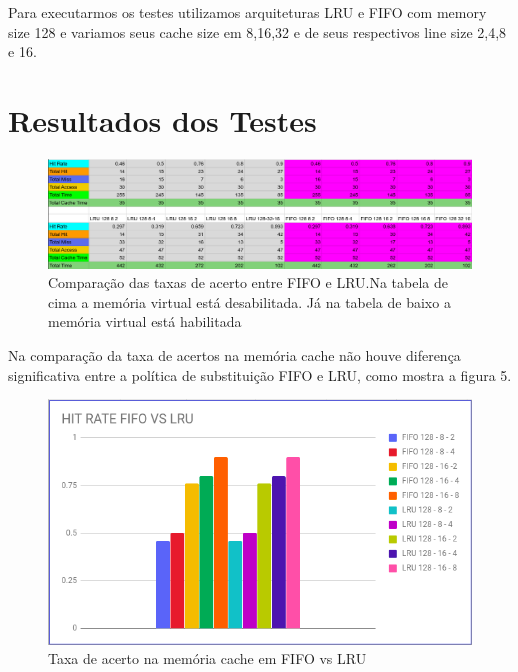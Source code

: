 \documentclass[conference]{IEEEtran}
\begin{document}
Para executarmos os testes utilizamos arquiteturas LRU e FIFO com memory size 128 e variamos seus cache size em 8,16,32 e de seus respectivos line size 2,4,8 e 16. 

\section{Resultados dos Testes}

\begin{figure}[H]
    \includegraphics[width=\linewidth]{Imagens/Tabela.png}
    \caption{Comparação das taxas de acerto entre FIFO e LRU.\break Na tabela de cima a memória virtual está desabilitada. Já na tabela de baixo a memória virtual está habilitada}
    \label{fig:Comparação das taxas de acerto entre FIFO e LRU. Na tabela de cima a memória virtual está desabilitada. Já na tabela de baixo a memória virtual está habilitada}
\end{figure}

Na comparação da taxa de acertos na memória cache não houve diferença significativa entre a política de substituição FIFO e LRU, como mostra a figura 5.

\begin{figure}[H]
    \includegraphics[width=\linewidth]{Imagens/Hit_RATE_FIFO_VS_LRU.png}
    \caption{Taxa de acerto na memória cache em FIFO vs LRU}
    \label{fig:Taxa de acerto na memória cache em FIFO vs LRU}
\end{figure}
\end{document}
